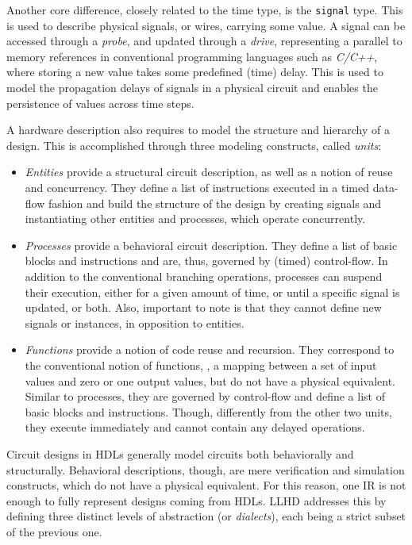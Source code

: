 Another core difference, closely related to the time type, is the \texttt{signal} type. This is used to describe physical signals, or wires, carrying some value. A signal can be accessed through a \textit{probe}, and updated through a \textit{drive}, representing a parallel to memory references in conventional programming languages such as \textit{C/C++}, where storing a new value takes some predefined (time) delay. This is used to model the propagation delays of signals in a physical circuit and enables the persistence of values across time steps.

A hardware description also requires to model the structure and hierarchy of a design. This is accomplished through three modeling constructs, called \textit{units}:
\begin{itemize}
    \item \textit{Entities} provide a structural circuit description, as well as a notion of reuse and concurrency. They define a list of instructions executed in a timed data-flow fashion and build the structure of the design by creating signals and instantiating other entities and processes, which operate concurrently.
    \item \textit{Processes} provide a behavioral circuit description. They define a list of basic blocks and instructions and are, thus, governed by (timed) control-flow. In addition to the conventional branching operations, processes can suspend their execution, either for a given amount of time, or until a specific signal is updated, or both. Also, important to note is that they cannot define new signals or instances, in opposition to entities.
    \item \textit{Functions} provide a notion of code reuse and recursion. They correspond to the conventional notion of functions, \ie, a mapping between a set of input values and zero or one output values, but do not have a physical equivalent. Similar to processes, they are governed by control-flow and define a list of basic blocks and instructions. Though, differently from the other two units, they execute immediately and cannot contain any delayed operations.
\end{itemize}


Circuit designs in HDLs generally model circuits both behaviorally and structurally. Behavioral descriptions, though, are mere verification and simulation constructs, which do not have a physical equivalent. For this reason, one IR is not enough to fully represent designs coming from HDLs. LLHD addresses this by defining three distinct levels of abstraction (or \textit{dialects}), each being a strict subset of the previous one.

